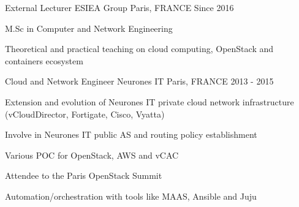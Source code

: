 \begin{cventries}
  \cventry
    {External Lecturer} %
    {ESIEA Group}
    {Paris, FRANCE} %
    {Since 2016} %
    {
      \begin{cvitems} %
      \item{M.Sc in Computer and Network Engineering} %
        \item {Theoretical and practical teaching on cloud computing, OpenStack
          and containers ecosystem}
      \end{cvitems}
    }

  \cventry
    {Cloud and Network Engineer}
    {Neurones IT} %
    {Paris, FRANCE} %
    {2013 - 2015} %
    {
      \begin{cvitems} %
        \item {Extension and evolution of Neurones IT private cloud
          network infrastructure (vCloudDirector, Fortigate, Cisco, Vyatta)}
        \item {Involve in Neurones IT public AS and routing policy
          establishment}
        \item {Various POC for OpenStack, AWS and vCAC}
        \item {Attendee to the Paris OpenStack Summit}
        \item {Automation/orchestration with tools like MAAS, Ansible and Juju}
      \end{cvitems}
    }

\end{cventries}

